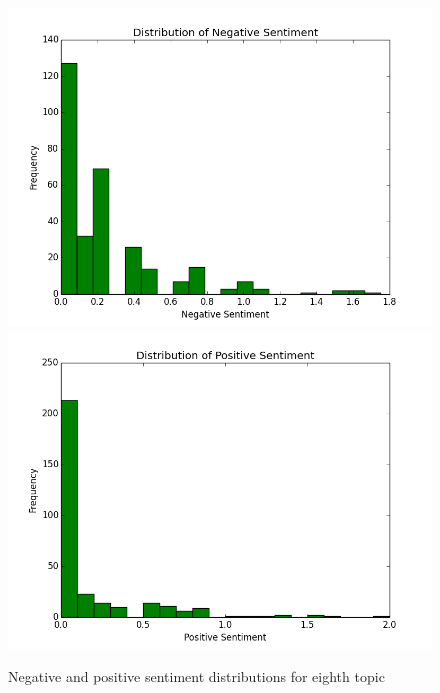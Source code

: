 \documentclass{article}
\begin{document}
\begin{enumerate}
		\begin{figure}[H]
			\includegraphics[scale=0.35]{7neg.png}
			\includegraphics[scale=0.35]{7pos.png}
			\begin{center}
			\caption{Negative and positive sentiment distributions for eighth topic}
			\end{center}
		\end{figure}
		
	\end{enumerate}
	
\end{document}
